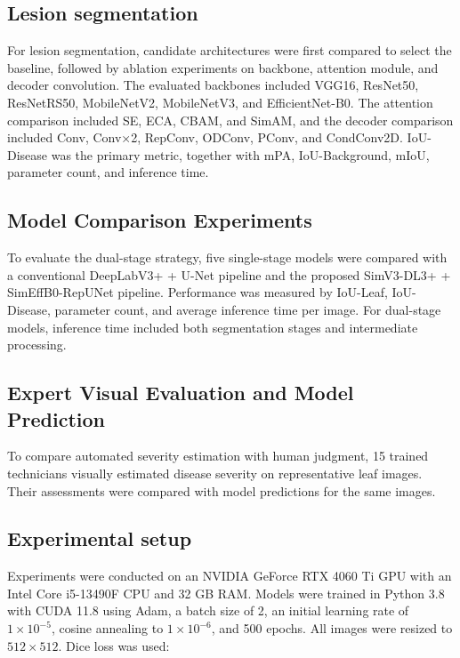 \documentclass[
]{article}
\begin{document}
\hypertarget{lesion-segmentation}{%
\subsection{Lesion segmentation}\label{lesion-segmentation}}

For lesion segmentation, candidate architectures were first compared to
select the baseline, followed by ablation experiments on backbone,
attention module, and decoder convolution. The evaluated backbones
included VGG16, ResNet50, ResNetRS50, MobileNetV2, MobileNetV3, and
EfficientNet-B0. The attention comparison included SE, ECA, CBAM, and
SimAM, and the decoder comparison included Conv, Conv×2, RepConv, ODConv,
PConv, and CondConv2D. IoU-Disease was the primary metric, together with
mPA, IoU-Background, mIoU, parameter count, and inference time.

\hypertarget{model-comparison-experiments}{%
\subsection{Model Comparison
Experiments}\label{model-comparison-experiments}}

To evaluate the dual-stage strategy, five single-stage models were
compared with a conventional DeepLabV3+ + U-Net pipeline and the proposed
SimV3-DL3+ + SimEffB0-RepUNet pipeline. Performance was measured by
IoU-Leaf, IoU-Disease, parameter count, and average inference time per
image. For dual-stage models, inference time included both segmentation
stages and intermediate processing.

\hypertarget{expert-visual-evaluation-and-model-prediction}{%
\subsection{Expert Visual Evaluation and Model
Prediction}\label{expert-visual-evaluation-and-model-prediction}}

To compare automated severity estimation with human judgment, 15 trained
technicians visually estimated disease severity on representative leaf
images. Their assessments were compared with model predictions for the
same images.

\hypertarget{experimental-setup}{%
\subsection{Experimental setup}\label{experimental-setup}}

Experiments were conducted on an NVIDIA GeForce RTX 4060 Ti GPU with an
Intel Core i5-13490F CPU and 32 GB RAM. Models were trained in Python 3.8
with CUDA 11.8 using Adam, a batch size of 2, an initial learning rate of
\(1 \times 10^{-5}\), cosine annealing to \(1 \times 10^{-6}\), and 500
epochs. All images were resized to \(512 \times 512\). Dice loss was used:
\end{document}

